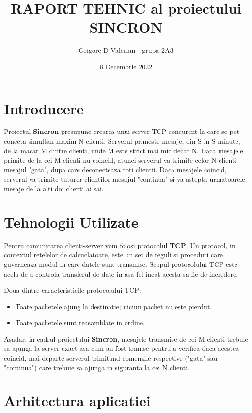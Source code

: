 \documentclass{article}
\title{RAPORT TEHNIC al proiectului SINCRON}
\author{Grigore D Valerian -  grupa 2A3}
\date{6 Decembrie 2022}
\begin{document}
\maketitle

\section{Introducere}

 Proiectul \textbf{Sincron} presupune crearea unui server TCP concurent la care se pot conecta simultan maxim N clienti. Serverul primeste mesaje, din S in S minute, de la macar M dintre clienti, unde M este strict mai mic decat N. Daca mesajele primite de la cei M clienti nu coincid, atunci serverul va trimite celor N clienti mesajul "gata", dupa care deconecteaza toti clientii. Daca mesajele coincid, serverul va trimite tuturor clientilor mesajul "continua" si va astepta urmatoarele mesaje de la alti doi clienti ai sai.


\section{Tehnologii Utilizate}

 Pentru comunicarea clienti-server vom folosi protocolul \textbf{TCP}. Un protocol, in contextul retelelor de calcuclatoare, este un set de reguli si proceduri care guverneaza modul in care datele sunt transmise. Scopul protocolului TCP este acela de a controla transferul de date in asa fel incat acesta sa fie de incredere.

\begin{itemize}
    Doua dintre caracteristicile protocolului TCP:
\end{itemize}
\begin{itemize}
    \item Toate pachetele ajung la destinatie; niciun pachet nu este pierdut.
    \item Toate pachetele sunt reasamblate in ordine.
\end{itemize}
\begin{itemize}
    Asadar, in cadrul proiectului \textbf{Sincron}, mesajele transmise de cei M clienti trebuie sa ajunga la server exact asa cum au fost trimise pentru a verifica daca acestea coincid, mai departe serverul trimitand comenzile respective ("gata" sau "continua") care trebuie sa ajunga in siguranta la cei N clienti.
\end{itemize}

\section{Arhitectura aplicatiei}
\end{document}
